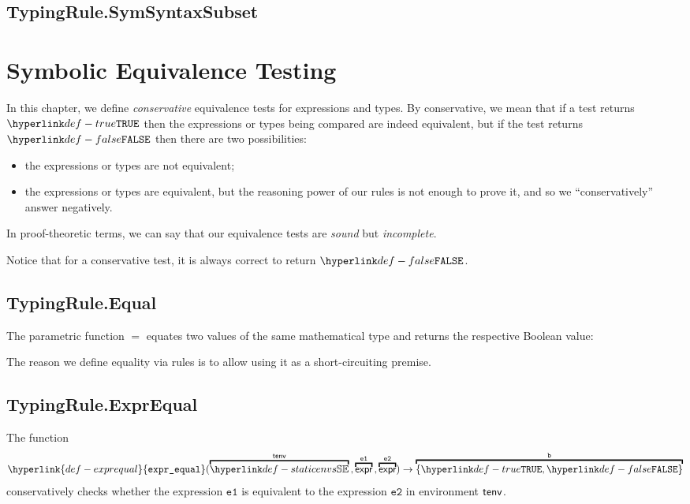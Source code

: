 \documentclass{book}
\newcommand\exprequal[0]{\hyperlink{def-exprequal}{\texttt{expr\_equal}}}
\newcommand\veone[0]{\texttt{e1}}
\newcommand\vetwo[0]{\texttt{e2}}
\begin{document}
\section{TypingRule.SymSyntaxSubset}
\hypertarget{def-symsyntaxsubset}{}

\chapter{Symbolic Equivalence Testing \label{chap:symbolicequivalencetesting}}

In this chapter, we define \emph{conservative} equivalence tests for expressions and types.
By conservative, we mean that if a test returns $\True$ then the expressions or types being
compared are indeed equivalent, but if the test returns $\False$ then
there are two possibilities:
\begin{itemize}
  \item the expressions or types are not equivalent;
  \item the expressions or types are equivalent, but the reasoning power of our rules
  is not enough to prove it, and so we ``conservatively'' answer negatively.
\end{itemize}
In proof-theoretic terms, we can say that our equivalence tests are \emph{sound} but \emph{incomplete}.

Notice that for a conservative test, it is always correct to return $\False$.

\section{TypingRule.Equal}
\hypertarget{def-equal}{}
The parametric function $\equal$ equates two values of the same mathematical type and returns
the respective Boolean value:
The reason we define equality via rules is to allow using it as a short-circuiting premise.

\section{TypingRule.ExprEqual}
The function
\[
  \exprequal(\overname{\staticenvs}{\tenv} \aslsep \overname{\expr}{\veone} \aslsep \overname{\expr}{\vetwo}) \rightarrow \overname{\{\True, \False\}}{\vb}
\]
conservatively checks whether the expression $\veone$ is equivalent to the expression $\vetwo$ in environment $\textsf{tenv}$.
\end{document}
